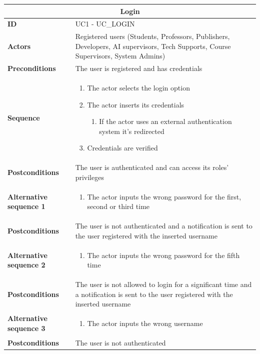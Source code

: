 \begin{tabular}{|m{2.5cm}|m{8cm}|}
	\hline
	\multicolumn{2}{|c|}{Login} \\
	\hline
	\textbf{ID} & UC1 - UC\_LOGIN \\
	\hline
	\textbf{Actors} & Registered users (Students, Professors, Publishers, Developers, AI supervisors, Tech Supports, Course Supervisors, System Admins)\\
	\hline
	\textbf{Preconditions} & The user is registered and has credentials \\
	\hline
	\textbf{Sequence} & 
	\begin{enumerate}
		\item The actor selects the login option
		\item The actor inserts its credentials
		\begin{enumerate}
			\item If the actor uses an external authentication system it’s redirected
		\end{enumerate}
		\item Credentials are verified
	\end{enumerate} \\
	\hline
	\textbf{Postconditions} & The user is authenticated and can access its roles’ privileges \\
	\hline
	
	\textbf{Alternative sequence 1} & 
	\begin{enumerate}
		\item The actor inputs the wrong password for the first, second or third time
	\end{enumerate} \\
	\hline
	\textbf{Postconditions} & The user is not authenticated and a notification is sent to the user registered with the inserted username \\
	\hline
	
	\textbf{Alternative sequence 2} & 
	\begin{enumerate}
		\item The actor inputs the wrong password for the fifth time
	\end{enumerate} \\
	\hline
	\textbf{Postconditions} & The user is not allowed to login for a significant time and a notification is sent to the user registered with the inserted username \\
	\hline
	
	\textbf{Alternative sequence 3} & 
	\begin{enumerate}
		\item The actor inputs the wrong username
	\end{enumerate} \\
	\hline
	\textbf{Postconditions} & The user is not authenticated \\
	\hline
\end{tabular}

